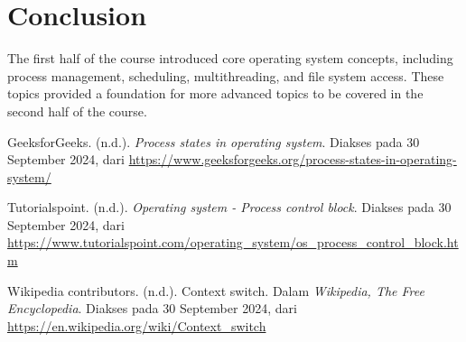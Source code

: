 \documentclass[12pt]{article}
\begin{document}
\section{Conclusion}
The first half of the course introduced core operating system concepts, including process management, scheduling, multithreading, and file system access. These topics provided a foundation for more advanced topics to be covered in the second half of the course.


\begin{thebibliography}{}

\bibitem{}
GeeksforGeeks. (n.d.). \textit{Process states in operating system}. Diakses pada 30 September 2024, dari \url{https://www.geeksforgeeks.org/process-states-in-operating-system/}

\bibitem{}
Tutorialspoint. (n.d.). \textit{Operating system - Process control block}. Diakses pada 30 September 2024, dari \url{https://www.tutorialspoint.com/operating_system/os_process_control_block.htm}

\bibitem{}
Wikipedia contributors. (n.d.). Context switch. Dalam \textit{Wikipedia, The Free Encyclopedia}. Diakses pada 30 September 2024, dari \url{https://en.wikipedia.org/wiki/Context_switch}

\end{thebibliography}
\end{document}
